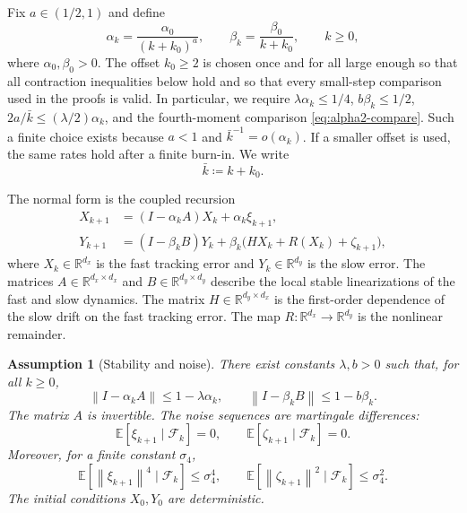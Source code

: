\documentclass{article}
\newtheorem{assumption}[theorem]{Assumption}
\newcommand{\R}{\mathbb{R}}
\newcommand{\E}{\mathbb{E}}
\newcommand{\norm}[1]{\left\lVert #1\right\rVert}
\begin{document}
Fix $a\in(1/2,1)$ and define
\begin{equation}
  \alpha_k = \frac{\alpha_0}{(k+k_0)^a},\qquad
  \beta_k = \frac{\beta_0}{k+k_0},\qquad k\ge0, \label{eq:stepsizes}
\end{equation}
where $\alpha_0,\beta_0>0$. The offset $k_0\ge2$ is chosen once and for all large enough so that all contraction inequalities below hold and so that every small-step comparison used in the proofs is valid. In particular, we require $\lambda\alpha_k\le1/4$, $b\beta_k\le1/2$, $2a/\bar k\le(\lambda/2)\alpha_k$, and the fourth-moment comparison \eqref{eq:alpha2-compare}. Such a finite choice exists because $a<1$ and $\bar k^{-1}=o(\alpha_k)$. If a smaller offset is used, the same rates hold after a finite burn-in. We write
\[
  \bar k \coloneqq k+k_0.
\]

The normal form is the coupled recursion
\begin{align}
  X_{k+1} &= (I-\alpha_k A)X_k+\alpha_k\xi_{k+1}, \label{eq:fast}\\
  Y_{k+1} &= (I-\beta_k B)Y_k+
             \beta_k\big(HX_k+R(X_k)+\zeta_{k+1}\big), \label{eq:slow}
\end{align}
where $X_k\in\R^{d_x}$ is the fast tracking error and $Y_k\in\R^{d_y}$ is the slow error. The matrices $A\in\R^{d_x\times d_x}$ and $B\in\R^{d_y\times d_y}$ describe the local stable linearizations of the fast and slow dynamics. The matrix $H\in\R^{d_y\times d_x}$ is the first-order dependence of the slow drift on the fast tracking error. The map $R:\R^{d_x}\to\R^{d_y}$ is the nonlinear remainder.

\begin{assumption}[Stability and noise]\label{ass:stability}
There exist constants $\lambda,b>0$ such that, for all $k\ge0$,
\begin{equation}
  \norm{I-\alpha_k A}\le 1-\lambda\alpha_k,
  \qquad
  \norm{I-\beta_k B}\le 1-b\beta_k. \label{eq:matrix-contraction}
\end{equation}
The matrix $A$ is invertible. The noise sequences are martingale differences:
\begin{equation}
  \E[\xi_{k+1}\mid\mathcal F_k]=0,
  \qquad
  \E[\zeta_{k+1}\mid\mathcal F_k]=0. \label{eq:mds}
\end{equation}
Moreover, for a finite constant $\sigma_4$,
\begin{equation}
  \E[\norm{\xi_{k+1}}^4\mid\mathcal F_k]\le \sigma_4^4,
  \qquad
  \E[\norm{\zeta_{k+1}}^2\mid\mathcal F_k]\le \sigma_4^2. \label{eq:moment-noise}
\end{equation}
The initial conditions $X_0,Y_0$ are deterministic.
\end{assumption}
\end{document}
